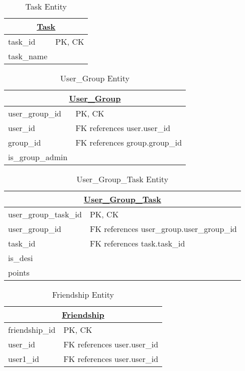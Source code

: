\documentclass[11pt, a4paper]{report}
\begin{document}
\begin{table}[H]
\centering
\caption{Task Entity}
\label{}
\begin{tabular}{|l|l|}
\hline
\multicolumn{2}{|c|}{{\ul \textbf{Task}}} \\ \hline
task\_id & PK, CK \\
task\_name &  \\

\end{tabular}
\end{table}

\begin{table}[H]
\centering
\caption{User\_Group Entity}
\label{}
\begin{tabular}{|l|l|}
\hline
\multicolumn{2}{|c|}{{\ul \textbf{User\_Group}}} \\ \hline
user\_group\_id & PK, CK \\
user\_id & FK references user.user\_id \\
group\_id & FK references group.group\_id \\
is\_group\_admin & 
\end{tabular}
\end{table}

\begin{table}[H]
\centering
\caption{User\_Group\_Task Entity}
\label{}
\begin{tabular}{|l|l|}
\hline
\multicolumn{2}{|c|}{{\ul \textbf{User\_Group\_Task}}} \\ \hline
user\_group\_task\_id & PK, CK \\
user\_group\_id & FK references user\_group.user\_group\_id \\
task\_id & FK references task.task\_id \\
is\_desi &  \\
points & 
\end{tabular}
\end{table}

\begin{table}[H]
\centering
\caption{Friendship Entity}
\label{}
\begin{tabular}{|l|l|}
\hline
\multicolumn{2}{|c|}{{\ul \textbf{Friendship}}} \\ \hline
friendship\_id & PK, CK \\
user\_id & FK references user.user\_id \\
user1\_id & FK references user.user\_id
\end{tabular}
\end{table}
\end{document}
